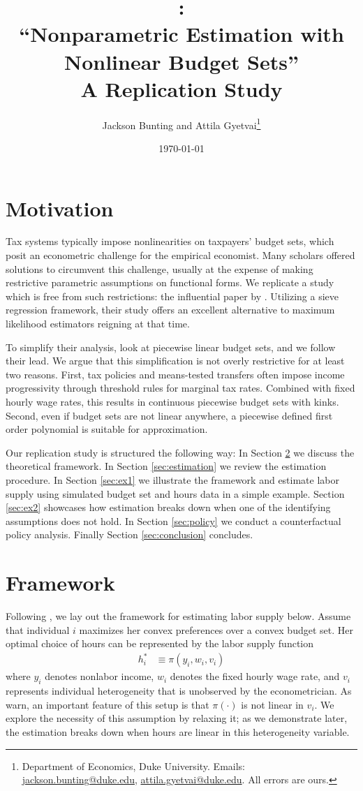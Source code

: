 \documentclass[11pt,letterpaper]{article}                  %
\title{\citet{Blomquist2002}: \\ ``Nonparametric Estimation with Nonlinear Budget Sets'' \\ \smallskip \Large{A Replication Study}}
\author{Jackson Bunting and Attila Gyetvai\footnote{Department of Economics, Duke University. Emails: \href{mailto:jackson.bunting@duke.edu}{jackson.bunting@duke.edu}, \href{mailto:attila.gyetvai@duke.edu}{attila.gyetvai@duke.edu}. All errors are ours.}}
\date{\today}
\begin{document}
\maketitle

\section{Motivation}

Tax systems typically impose nonlinearities on taxpayers' budget sets, which posit an econometric challenge for the empirical economist.
Many scholars offered solutions to circumvent this challenge, usually at the expense of making restrictive parametric assumptions on functional forms.
We replicate a study which is free from such restrictions: the influential paper by \citet{Blomquist2002}.
Utilizing a sieve regression framework, their study offers an excellent alternative to maximum likelihood estimators reigning at that time.

To simplify their analysis, \citet{Blomquist2002} look at piecewise linear budget sets, and we follow their lead.
We argue that this simplification is not overly restrictive for at least two reasons.
First, tax policies and means-tested transfers often impose income progressivity through threshold rules for marginal tax rates.
Combined with fixed hourly wage rates, this results in continuous piecewise budget sets with kinks.
Second, even if budget sets are not linear anywhere, a piecewise defined first order polynomial is suitable for approximation.

Our replication study is structured the following way:
In Section \ref{sec:framework} we discuss the theoretical framework.
In Section \ref{sec:estimation} we review the estimation procedure.
In Section \ref{sec:ex1} we illustrate the framework and estimate labor supply using simulated budget set and hours data in a simple example.
Section \ref{sec:ex2} showcases how estimation breaks down when one of the identifying assumptions does not hold.
In Section \ref{sec:policy} we conduct a counterfactual policy analysis.
Finally Section \ref{sec:conclusion} concludes.


\section{Framework}
\label{sec:framework}

Following \citet{Blomquist2002}, we lay out the framework for estimating labor supply below.
Assume that individual $i$ maximizes her convex preferences over a convex budget set.
Her optimal choice of hours can be represented by the labor supply function
\begin{align*}
	h_i^* &\equiv \pi (y_i, w_i, v_i)
\end{align*}
where $y_i$ denotes nonlabor income, $w_i$ denotes the fixed hourly wage rate, and $v_i$ represents individual heterogeneity that is unobserved by the econometrician.
As \citet{Blomquist2002} warn, an important feature of this setup is that $\pi(\cdot)$ is not linear in $v_i$.
We explore the necessity of this assumption by relaxing it; as we demonstrate later, the estimation breaks down when hours are linear in this heterogeneity variable.
\end{document}
